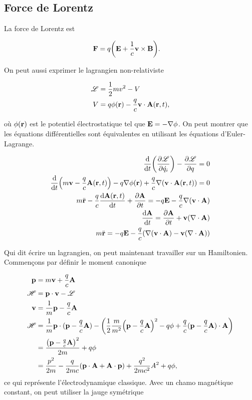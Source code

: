 
\subsection{Force de Lorentz} %
\label{sub:Force de Lorentx}

La force de Lorentz est

\begin{align}
    \vb{F}&=q\qty(\vb{E}+\frac1c\vb{v}\times\vb{B}).
\end{align}

On peut aussi exprimer le lagrangien non-relativiste

\begin{align}
    \mathscr{L}&=\frac12mv^2-V\\
    V&=q\phi(\vb{r})-\frac qc\vb{v}\cdot\vb{A}(\vb{r},t),
\end{align}

où $\phi(\vb{r})$ est le potentiel électrostatique tel que $\vb{E}=-\nabla\phi$.
On peut montrer que les équations différentielles sont équivalentes en  utilisant
les équations d'Euler-Lagrange.

\begin{align}
    \dv{t} \qty(\pdv{\mathscr{L}}{\dot{q_i}})-\pdv{\mathscr{L}}{q}=0\\
    \dv{t} \qty(m\vb{v}-\frac qc\vb{A}(\vb{r},t))-q\nabla\phi(\vb{r})+\frac qc\nabla\qty(
    \vb{v}\cdot\vb{A}(\vb{r},t))=0\\
    m\ddot{\vb{r}}-\frac qc\dv{\vb{A}(\vb{r},t)}{t}+\pdv{\vb{A}}{t}=-q\vb{E}-\frac qc\nabla(\vb{v}\cdot
    \vb{A})\\
\dv{\vb{A}}{t}=\pdv{\vb{A}}{t}+\vb{v}(\nabla\cdot\vb{A})\\
m\ddot{\vb{r}}=-q\vb{E}-\frac qc\qty(\nabla(\vb{v}\cdot\vb{A})-\vb{v}(\nabla\cdot\vb{A}))
\end{align}

Qui dit écrire un lagrangien, on peut maintenant travailler sur un Hamiltonien.
Commençons par définir le moment canonique

\begin{align}
    \vb{p}&=m\vb{v}+\frac qc\vb{A}\\
    \mathscr{H}&=\vb{p}\cdot\vb{v}-\mathscr{L}\\
    \vb{v}&=\frac1m\vb{p}-\frac qc\vb{A}\\
    \mathscr{H}&=\frac1m\vb{p}\cdot(\vb{p}-\frac qc\vb{A})-\qty(\frac12\frac m{m^2}
    \qty(\vb{p}-\frac qc\vb{A})^2-q\phi+\frac qc(\vb{p}-\frac qc\vb{A})\cdot\vb{A})\\
               &=\frac{\qty(\vb{p}-\frac qc\vb{A})^2}{2m}+q\phi\\
               &=\frac{p^2}{2m}-\frac q{2mc}(\vb{p}\cdot\vb{A}+\vb{A}\cdot\vb{p})
               +\frac{q^2}{2mc^2}A^2+q\phi,
\end{align}
ce qui représente l'électrodynamique classique. Avec un chamo magnétique constant,
on peut utiliser la jauge symétrique

